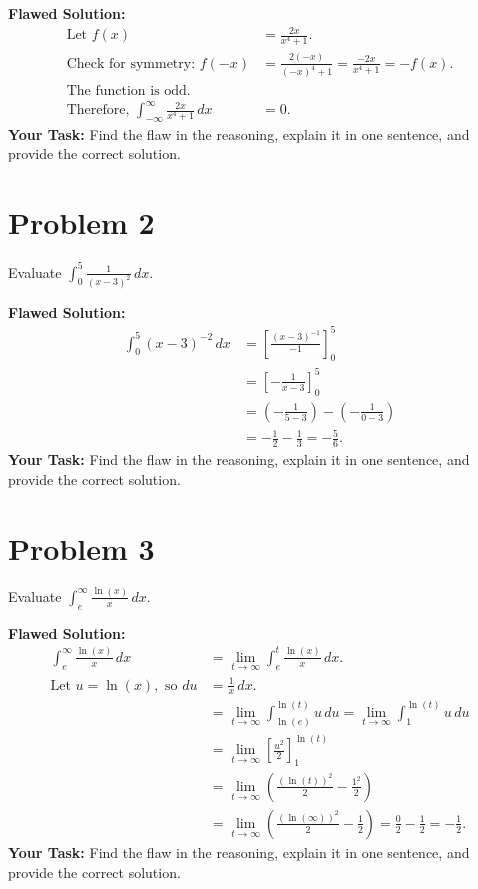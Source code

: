 \documentclass{article}
\begin{document}
\textbf{Flawed Solution:}
\begin{align*}
    \text{Let } f(x) &= \frac{2x}{x^4 + 1}. \\
    \text{Check for symmetry: } f(-x) &= \frac{2(-x)}{(-x)^4 + 1} = \frac{-2x}{x^4 + 1} = -f(x). \\
    \text{The function is odd.} \\
    \text{Therefore, } \int_{-\infty}^{\infty} \frac{2x}{x^4 + 1} \,dx &= 0.
\end{align*}
\textbf{Your Task:} Find the flaw in the reasoning, explain it in one sentence, and provide the correct solution.

\section{Problem 2}
Evaluate $\displaystyle \int_{0}^{5} \frac{1}{(x-3)^2} \,dx$.

\textbf{Flawed Solution:}
\begin{align*}
    \int_{0}^{5} (x-3)^{-2} \,dx &= \left[ \frac{(x-3)^{-1}}{-1} \right]_{0}^{5} \\
    &= \left[ -\frac{1}{x-3} \right]_{0}^{5} \\
    &= \left(-\frac{1}{5-3}\right) - \left(-\frac{1}{0-3}\right) \\
    &= -\frac{1}{2} - \frac{1}{3} = -\frac{5}{6}.
\end{align*}
\textbf{Your Task:} Find the flaw in the reasoning, explain it in one sentence, and provide the correct solution.

\section{Problem 3}
Evaluate $\displaystyle \int_{e}^{\infty} \frac{\ln(x)}{x} \,dx$.

\textbf{Flawed Solution:}
\begin{align*}
    \int_{e}^{\infty} \frac{\ln(x)}{x} \,dx &= \lim_{t \to \infty} \int_{e}^{t} \frac{\ln(x)}{x} \,dx. \\
    \text{Let } u = \ln(x), \text{ so } du &= \frac{1}{x} \,dx. \\
    &= \lim_{t \to \infty} \int_{\ln(e)}^{\ln(t)} u \,du = \lim_{t \to \infty} \int_{1}^{\ln(t)} u \,du \\
    &= \lim_{t \to \infty} \left[ \frac{u^2}{2} \right]_{1}^{\ln(t)} \\
    &= \lim_{t \to \infty} \left( \frac{(\ln(t))^2}{2} - \frac{1^2}{2} \right) \\
    &= \lim_{t \to \infty} \left( \frac{(\ln(\infty))^2}{2} - \frac{1}{2} \right) = \frac{0}{2} - \frac{1}{2} = -\frac{1}{2}.
\end{align*}
\textbf{Your Task:} Find the flaw in the reasoning, explain it in one sentence, and provide the correct solution.
\end{document}
